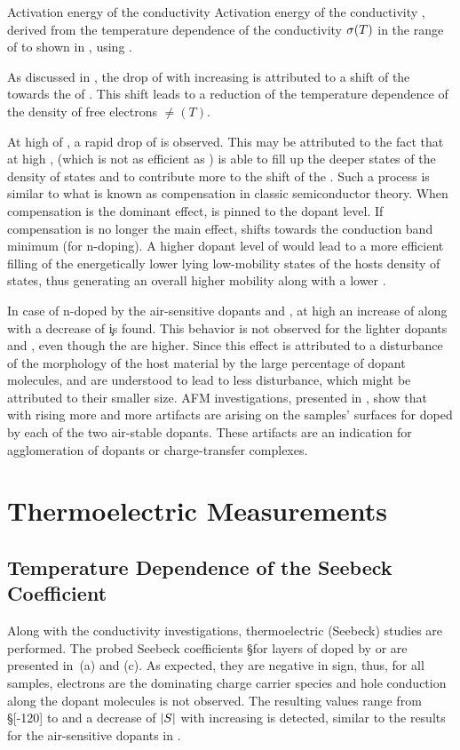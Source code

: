 %
{Activation energy of the conductivity}%
{Activation energy of the conductivity \Eact, derived from the temperature dependence of the conductivity $\c(T)$ in the range of \T[25] to  shown in , using .
}%

As discussed in , the drop of \Eact with increasing \CLong is attributed to a shift of the \EfLong \Ef towards the \EtLong \Et of \CS. This shift leads to a reduction of the temperature dependence of the density of free electrons $\ne(T)$.

%
At high \CLongs of \aob, a rapid drop of \Eact is observed. This may be attributed to the fact that at high \C, \aob (which is not as efficient as \dmbi) is able to fill up the deeper states of the density of states and to contribute more to the shift of the \Ef. Such a process is similar to what is known as compensation in classic semiconductor theory. When compensation is the dominant effect, \Ef is pinned to the dopant level. If compensation is no longer the main effect, \Ef shifts towards the conduction band minimum \Ec (for n-doping).
A higher dopant level of \dmbi would lead to a more efficient filling of the energetically lower lying low-mobility states of the hosts density of states, thus generating an overall higher mobility along with a lower \Eact.

In case of \CS n-doped by the air-sensitive dopants \CrPd and \WPd, at high \CLongs an increase of \Eact along with a decrease of \c is found. This behavior is not observed for the lighter dopants \aob and \dmbi, even though the \CLongs are higher. Since this effect is attributed to a disturbance of the morphology of the host material by the large percentage of dopant molecules, \aob and \dmbi are understood to lead to less disturbance, which might be attributed to their smaller size. AFM investigations, presented in , show that with rising \CLong more and more artifacts are arising on the samples' surfaces for \CS doped by each of the two air-stable dopants. These artifacts are an indication for agglomeration of dopants or charge-transfer complexes.

\section{Thermoelectric Measurements}\label{sec:ResAS-S}
\subsection{Temperature Dependence of the Seebeck Coefficient}
\label{sec:ResAS-S-T}
%
%
Along with the conductivity investigations, thermoelectric (Seebeck) studies are performed. The probed Seebeck coefficients \S for layers of \CS doped by \aob or \dmbi are presented in \,(a) and (c). As expected, they are negative in sign, thus, for all samples, electrons are the dominating charge carrier species and hole conduction along the dopant molecules is not observed. The resulting values range from \S[-120] to  and a decrease of $|\S|$ with increasing \C is detected, similar to the results for the air-sensitive dopants in .

